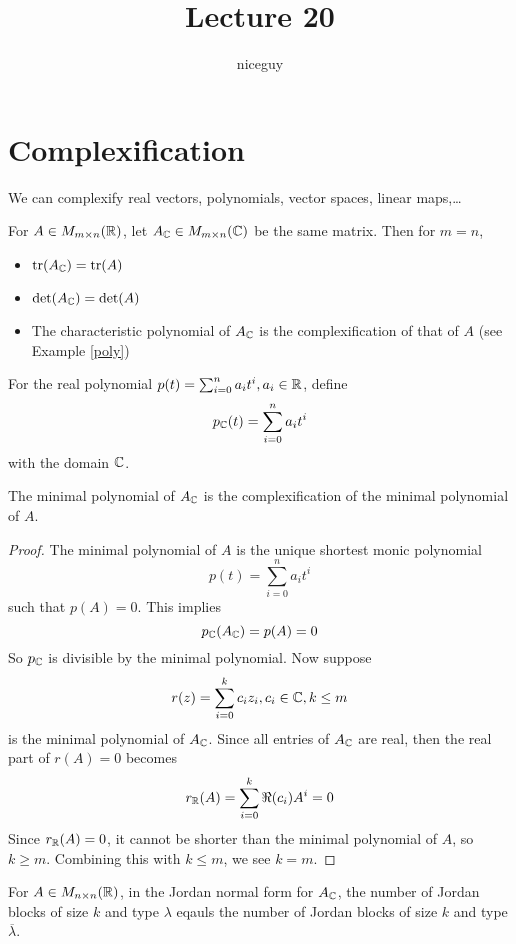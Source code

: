 \documentclass[12pt]{article}
\author{niceguy}
\title{Lecture 20}
\begin{document}
\maketitle

\section{Complexification}

We can complexify real vectors, polynomials, vector spaces, linear maps,\dots

\begin{ex}[Matrices]
    For $A \in M_{m \times n}(\mathbb{R})$, let $A_{\mathbb{C}} \in M_{m \times n}(\mathbb{C})$ be the same matrix. Then for $m=n$,
    \begin{itemize}
        \item $\operatorname{tr}(A_{\mathbb{C}}) = \operatorname{tr}(A)$
        \item $\det(A_{\mathbb{C}}) = \det(A)$
        \item The characteristic polynomial of $A_{\mathbb{C}}$ is the complexification of that of $A$ (see Example \ref{poly})
    \end{itemize}
\end{ex}

\begin{ex}[Polynomials] \label{poly}
    For the real polynomial $p(t) = \sum_{i=0}^n a_it^i, a_i \in \mathbb{R}$, define    $$p_{\mathbb{C}}(t) = \sum_{i=0}^n a_it^i$$
    with the domain $\mathbb{C}$.
\end{ex}

\begin{prop}
    The minimal polynomial of $A_{\mathbb{C}}$ is the complexification of the minimal polynomial of $A$.
\end{prop}

\begin{proof}
    The minimal polynomial of $A$ is the unique shortest monic polynomial
    $$p(t) = \sum_{i=0}^n a_it^i$$
    such that $p(A)=0$. This implies
    $$p_{\mathbb{C}}(A_{\mathbb{C}}) = p(A) = 0 $$
    So $p_{\mathbb{C}}$ is divisible by the minimal polynomial. Now suppose
    $$r(z) = \sum_{i=0}^k c_iz_i, c_i \in \mathbb{C}, k \leq m$$
    is the minimal polynomial of $A_{\mathbb{C}}$. Since all entries of $A_{\mathbb{C}}$ are real, then the real part of $r(A) = 0$ becomes
    $$r_{\mathbb{R}}(A) = \sum_{i=0}^k \Re(c_i)A^i = 0$$
    Since $r_{\mathbb{R}}(A) = 0$, it cannot be shorter than the minimal polynomial of $A$, so $k \geq m$. Combining this with $k \leq m$, we see $k=m$.
\end{proof}

\begin{prop}
    For $A \in M_{n \times n}(\mathbb{R})$, in the Jordan normal form for $A_{\mathbb{C}}$, the number of Jordan blocks of size $k$ and type $\lambda$ eqauls the number of Jordan blocks of size $k$ and type $\overline{\lambda}$.
\end{prop}
\end{document}
